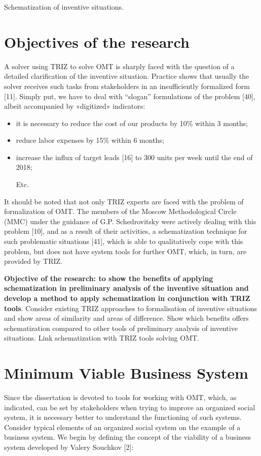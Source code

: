 \documentclass[11pt,a4paper]{book}
\begin{document}
\begin{center}\Large
  Schematization of inventive situations.
\end{center}

\section{Objectives of the research}
A solver using TRIZ to solve OMT is sharply faced with the question of a
detailed clarification of the inventive situation.  Practice shows that
usually the solver receives such tasks from stakeholders in an insufficiently
formalized form [11]. Simply put, we have to deal with “slogan” formulations
of the problem [40], albeit accompanied by «digitized» indicators:
\begin{itemize}
\item it is necessary to reduce the cost of our products by 10\% within 3
  months;
\item reduce labor expenses by 15\% within 6 months;
\item increase the influx of target leads [16] to 300 units per week until
  the end of 2018;
  
  Etc.
\end{itemize}
It should be noted that not only TRIZ experts are faced with the problem of
formalization of OMT. The members of the Moscow Methodological Circle (MMC)
under the guidance of G.P. Schedrovitsky were actively dealing with this
problem [10], and as a result of their activities, a schematization technique
for such problematic situations [41], which is able to qualitatively cope with
this problem, but does not have system tools for further OMT, which, in turn,
are provided by TRIZ.

\textbf{Objective of the research: to show the benefits of applying
  schematization in preliminary analysis of the inventive situation and
  develop a method to apply schematization in conjunction with TRIZ tools}.
Consider existing TRIZ approaches to formalisation of inventive situations and
show areas of similarity and areas of difference. Show which benefits offers
schematization compared to other tools of preliminary analysis of inventive
situations. Link schematization with TRIZ tools solving OMT.

\section{Minimum Viable Business System}
Since the dissertation is devoted to tools for working with OMT, which, as
indicated, can be set by stakeholders when trying to improve an organized
social system, it is necessary better to understand the functioning of such
systems. Consider typical elements of an organized social system on the
example of a business system.  We begin by defining the concept of the
viability of a business system developed by Valery Souchkov [2]:
\end{document}
